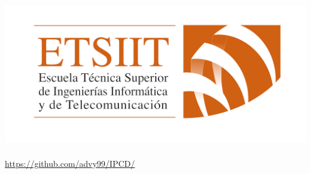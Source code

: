 \documentclass[12pt, spanish]{article}
\begin{document}
\begin{titlepage}
	 \includegraphics[scale = 0.20]{logo_etsiit.png}\\[0.3 cm]
    {\large \thedate}\\[0.75cm]
	 \url{https://github.com/advy99/IPCD/}\\[0.75cm]
    \doclicenseThis
\end{titlepage}



\pagestyle{fancy}




\tableofcontents
\pagebreak










\end{document}
